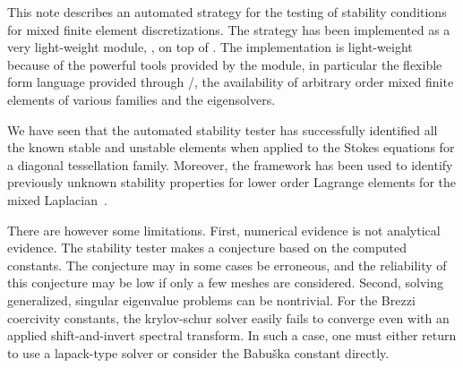 This note describes an automated strategy for the testing of stability
conditions for mixed finite element discretizations. The strategy has
been implemented as a very light-weight \pythonlang{} module,
\ascot{}, on top of \pydolfin{}. The implementation is light-weight
because of the powerful tools provided by the \pydolfin{} module, in
particular the flexible form language provided through \ufl{}/\ffc{},
the availability of arbitrary order mixed finite elements of various
families and the \slepc{} eigensolvers.

We have seen that the automated stability tester has successfully
identified all the known stable and unstable elements when applied to
the Stokes equations for a diagonal tessellation family. Moreover, the
framework has been used to identify previously unknown stability
properties for lower order Lagrange elements for the mixed
Laplacian~\cite{ArnoldRognes2009}.

There are however some limitations. First, numerical evidence is not
analytical evidence. The stability tester makes a conjecture based on
the computed constants. The conjecture may in some cases be erroneous,
and the reliability of this conjecture may be low if only a few meshes
are considered. Second, solving generalized, singular eigenvalue
problems can be nontrivial. For the Brezzi coercivity constants, the
krylov-schur solver easily fails to converge even with an applied
shift-and-invert spectral transform. In such a case, one must either
return to use a lapack-type solver or consider the Babu\v ska constant
directly.



